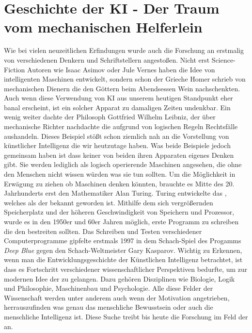 \documentclass[12pt,german,ngerman]{report}
\begin{document}
    \chapter{Geschichte der KI - Der Traum vom mechanischen Helferlein}
    Wie bei vielen neuzeitlichen Erfindungen wurde auch die Forschung an 
    erstmalig von verschiedenen Denkern und Schriftstellern angestoßen.
    Nicht erst Science-Fiction Autoren wie Isaac Asimov oder Jule Vernes haben die Idee von intelligenten Maschinen
    entwickelt, sondern schon der Grieche Homer schrieb von mechanischen Dienern die den Göttern beim Abendsessen
    Wein nachschenkten.\autocite[53]{buchanan2005very} Auch wenn diese Verwendung von KI aus unserem heutigen Standpunkt
    eher banal erscheint, ist ein solcher Apparat zu damaligen Zeiten undenkbar.
    Ein wenig weiter dachte der Philosoph Gottfried Wilhelm Leibniz, der über mechanische Richter nachdachte
    die aufgrund von logischen Regeln Rechtsfälle aushandeln.\autocite[53]{buchanan2005very}
    Dieses Beispiel stößt schon ziemlich nah an die Vorstellung von künstlicher Intelligenz die wir heutzutage haben.
    Was beide Beispiele jedoch gemeinsam haben ist dass keiner von beiden ihren Apparaten eigenes Denken
    gibt. Sie werden lediglich als logisch operierende Maschinen angesehen, die ohne den Menschen nicht wissen würden
    was sie tun sollten.
    Um die Möglichkeit in Erwägung zu ziehen ob Maschinen denken könnten,
    brauchte es Mitte des 20. Jahrhunderts erst den Mathematiker Alan Turing.\autocite{sesink1993menschliche}
    Turing entwickelte das , welches als der  bekannt geworden ist.
    Mithilfe dem sich vergrößernden Speicherplatz und der höheren Geschwindigkeit von Speichern und Prozessor,
    wurde es in den 1950er und 60er Jahren möglich, erste Programm zu schreiben die den  bestreiten sollten.
    Das Schreiben und Testen verschiedener Computerprogramme gipfelte erstmals 1997 in dem Schach-Spiel des Progamms \emph{Deep Blue}
    gegen den Schach-Weltmeister Gary Kasparov.\autocite{hsu1999ibm}
    Wichtig zu Erkennen, wenn man die Entwicklungsgeschichte der Künstlichen Intelligenz betrachtet, ist dass es Fortschritt verschiedener
    wissenschaftlicher Perspektiven\autocite{buchanan2005very} bedurfte, um zur modernen Idee der  zu gelangen.
    Dazu gehören Disziplinen wie Biologie, Logik und Philosophie, Maschinenbau und Psychologie.\autocite[56]{buchanan2005very}
    Alle diese Felder der Wissenschaft werden unter anderem auch wenn der Motivation angetrieben, herrauszufinden was genau
    das menschliche Bewusstsein oder auch die menschliche Intelligenz ist.
    Diese Suche treibt bis heute die Forschung im Feld der  an.
\end{document}
